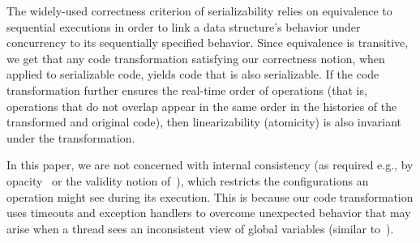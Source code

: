 The widely-used correctness criterion of serializability relies on equivalence to sequential executions in order to
link a data structure's behavior under concurrency to its sequentially specified behavior. Since equivalence is transitive,
we get that any code transformation satisfying our correctness notion, when applied to serializable code, yields code that is also serializable.
If the code transformation further ensures the real-time order of operations (that is, operations that do not overlap appear in the same order in the
histories of the transformed and original code), then linearizability (atomicity) is also invariant under the transformation.

In this paper, we are not concerned with internal consistency (as required e.g., by opacity~\cite{GuerraouiK2008} or the validity notion of~\cite{LevAriCK2014}),
which restricts the configurations an operation might see during its execution.
This is because our code transformation uses timeouts and exception handlers to overcome unexpected behavior that may arise when a thread sees an inconsistent view of global variables (similar to~\cite{Nakaike:2010}).


